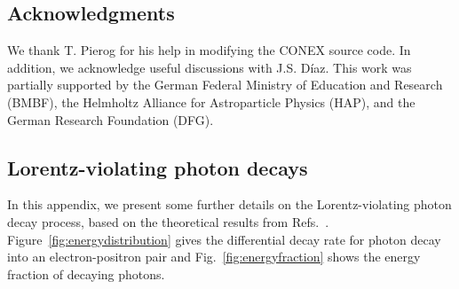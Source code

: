 \documentclass[aps,prd,preprint,longbibliography]{revtex4-1}
\begin{document}
\vspace*{-5mm}
\subsection*{Acknowledgments}
\vspace*{-3mm}
We thank T. Pierog for his help in modifying the CONEX
source code.
In addition, we acknowledge useful discussions with
J.S. D\'{i}az. This work was partially supported by the
German Federal Ministry of Education and Research (BMBF),
the Helmholtz Alliance for Astroparticle Physics (HAP),
and the German Research Foundation (DFG).

\vspace*{-5mm}
\begin{appendix}
\section{Lorentz-violating photon decays}
\label{app:Lorentz-violating-photon-decays}
\vspace*{-3mm}

In this appendix, we present some further details on the
Lorentz-violating photon decay process, based on the
theoretical results from
Refs.~\cite{KlinkhamerSchreck2008,DiazKlinkhamer2015}.
Figure~\ref{fig:energydistribution} gives the differential decay rate
for photon decay into an electron-positron pair
and Fig.~\ref{fig:energyfraction} shows the energy fraction
of decaying photons.


\end{appendix}
\end{document}
